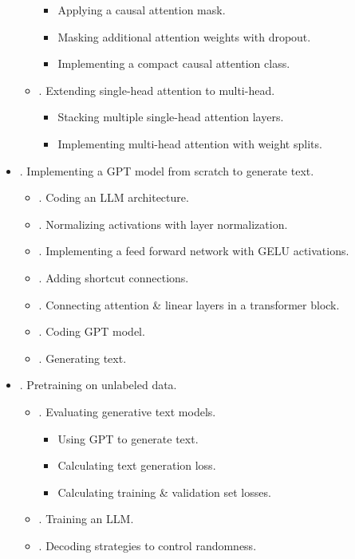 \documentclass{article}
\begin{document}
\begin{itemize}
\begin{itemize}
		\begin{itemize}
			\item {\sf Applying a causal attention mask.}
			\item {\sf Masking additional attention weights with dropout.}
			\item {\sf Implementing a compact causal attention class.}
		\end{itemize}
		\item {. Extending single-head attention to multi-head.}
		\begin{itemize}
			\item {\sf Stacking multiple single-head attention layers.}
			\item {\sf Implementing multi-head attention with weight splits.}
		\end{itemize}
	\end{itemize}
	\item {. Implementing a GPT model from scratch to generate text.}
	\begin{itemize}
		\item {. Coding an LLM architecture.}
		\item {. Normalizing activations with layer normalization.}
		\item {. Implementing a feed forward network with GELU activations.}
		\item {. Adding shortcut connections.}
		\item {. Connecting attention \& linear layers in a transformer block.}
		\item {. Coding GPT model.}
		\item {. Generating text.}
	\end{itemize}
	\item {. Pretraining on unlabeled data.}
	\begin{itemize}
		\item {. Evaluating generative text models.}
		\begin{itemize}
			\item {\sf Using GPT to generate text.}
			\item {\sf Calculating text generation loss.}
			\item {\sf Calculating training \& validation set losses.}
		\end{itemize}
		\item {. Training an LLM.}
		\item {. Decoding strategies to control randomness.}
		\begin{itemize}

\end{itemize}
\end{itemize}
\end{itemize}
\end{document}
